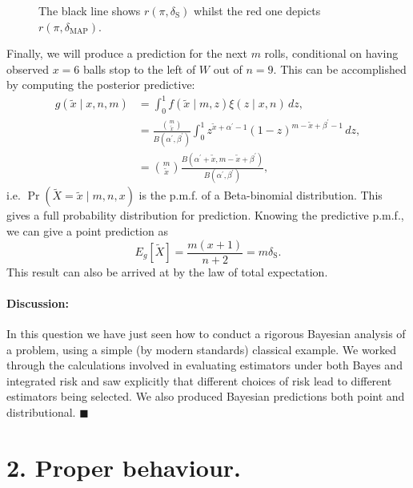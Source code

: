 \documentclass[a4paper,10pt, notitlepage]{report}
\newcommand{\pr}{\operatorname{Pr}} %
\begin{document}
{\begin{figure}[!ht]
{The black line shows $r(\pi, \delta_{\text{S}})$ whilst the red one depicts $r(\pi, \delta_{\text{MAP}})$.
}
\label{fig:integrated_risks_q1}
\end{figure}
Finally, we will produce a prediction for the next $m$ rolls, conditional on having observed $x=6$ balls stop to the left of $W$ out of $n=9$.
This can be accomplished by computing the posterior predictive:
\begin{align*}
 g(\tilde{x} \mid x, n, m) &= \int_{0}^{1} f(\tilde{x} \mid m, z)\xi(z \mid x, n)\,dz,\\
 &= \frac{ \binom{m}{\tilde{x}} }{ B(\alpha^\prime, \beta^\prime)}\int_{0}^{1} z^{\tilde{x} + \alpha^\prime - 1}(1-z)^{m - \tilde{x} + \beta^\prime - 1}\,dz,\\
 &= \binom{m}{\tilde{x}} \frac{B(\alpha^\prime + \tilde{x}, m - \tilde{x} + \beta^\prime)}{B(\alpha^\prime, \beta^\prime)},
\end{align*}
i.e. $\pr(\tilde{X} = \tilde{x} \mid m, n, x)$ is the p.m.f. of a Beta-binomial distribution.
This gives a full probability distribution for prediction.
Knowing the predictive p.m.f., we can give a point prediction as 
\begin{equation*}
E_g[\tilde{X}] = \frac{m(x+1)}{n+2} = m \delta_{\text{S}}.
\end{equation*}
This result can also be arrived at by the law of total expectation.
\paragraph{Discussion:} In this question we have just seen how to conduct a rigorous Bayesian analysis of a problem, using a simple (by modern standards) classical example.
We worked through the calculations involved in evaluating estimators under both Bayes and integrated risk and saw explicitly that different choices of risk lead to different estimators being selected.
We also produced Bayesian predictions both point and distributional.
$\blacksquare$
}

\section*{2. Proper behaviour.}
\end{document}
